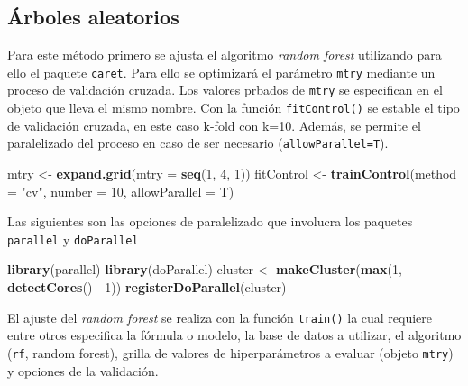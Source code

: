 \documentclass[11pt,b5paper,]{krantz}
\newenvironment{Shaded}{}{}
\newcommand{\DataTypeTok}[1]{\textcolor[rgb]{0.56,0.13,0.00}{#1}}
\newcommand{\DecValTok}[1]{\textcolor[rgb]{0.25,0.63,0.44}{#1}}
\newcommand{\KeywordTok}[1]{\textcolor[rgb]{0.00,0.44,0.13}{\textbf{#1}}}
\newcommand{\NormalTok}[1]{#1}
\newcommand{\OperatorTok}[1]{\textcolor[rgb]{0.40,0.40,0.40}{#1}}
\newcommand{\StringTok}[1]{\textcolor[rgb]{0.25,0.44,0.63}{#1}}
\begin{document}
\hypertarget{uxe1rboles-aleatorios}{%
\subsection{Árboles aleatorios}\label{uxe1rboles-aleatorios}}

Para este método primero se ajusta el algoritmo \emph{random forest} utilizando para ello el paquete \texttt{caret}. Para ello se optimizará el parámetro \texttt{mtry} mediante un proceso de validación cruzada. Los valores prbados de \texttt{mtry} se especifican en el objeto que lleva el mismo nombre. Con la función \texttt{fitControl()} se estable el tipo de validación cruzada, en este caso k-fold con k=10. Además, se permite el paralelizado del proceso en caso de ser necesario (\texttt{allowParallel=T}).

\begin{Shaded}
\begin{Highlighting}[]
\NormalTok{mtry <-}\StringTok{ }\KeywordTok{expand.grid}\NormalTok{(}\DataTypeTok{mtry =} \KeywordTok{seq}\NormalTok{(}\DecValTok{1}\NormalTok{, }\DecValTok{4}\NormalTok{, }\DecValTok{1}\NormalTok{))}
\NormalTok{fitControl <-}\StringTok{ }\KeywordTok{trainControl}\NormalTok{(}\DataTypeTok{method =} \StringTok{"cv"}\NormalTok{,}
                           \DataTypeTok{number =} \DecValTok{10}\NormalTok{,}
                           \DataTypeTok{allowParallel =}\NormalTok{ T)}
\end{Highlighting}
\end{Shaded}

Las siguientes son las opciones de paralelizado que involucra los paquetes \texttt{parallel} y \texttt{doParallel}

\begin{Shaded}
\begin{Highlighting}[]
\KeywordTok{library}\NormalTok{(parallel)}
\KeywordTok{library}\NormalTok{(doParallel)}
\NormalTok{cluster <-}\StringTok{ }\KeywordTok{makeCluster}\NormalTok{(}\KeywordTok{max}\NormalTok{(}\DecValTok{1}\NormalTok{, }\KeywordTok{detectCores}\NormalTok{() }\OperatorTok{-}\StringTok{ }\DecValTok{1}\NormalTok{))}
\KeywordTok{registerDoParallel}\NormalTok{(cluster)}
\end{Highlighting}
\end{Shaded}

El ajuste del \emph{random forest} se realiza con la función \texttt{train()} la cual requiere entre otros especifica la fórmula o modelo, la base de datos a utilizar, el algoritmo (\texttt{rf}, random forest), grilla de valores de hiperparámetros a evaluar (objeto \texttt{mtry}) y opciones de la validación.
\end{document}
